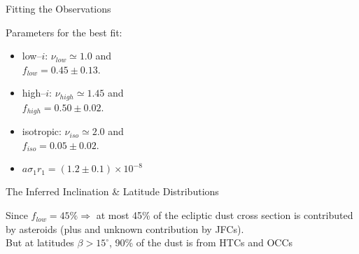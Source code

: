 \documentclass[20pt,35mmSlide,landscape]{foils}
\begin{document}
\vspace*{-2in}\parbox{10in}{
\parbox[c]{3.5in}{
\begin{center}
{\large
\vspace*{3ex}Fitting the Observations\vspace*{2ex}}
\end{center}
Parameters for the best fit:
\begin{itemize}
\item low--$i$: $\nu_{low}\simeq1.0$ and\\
$f_{low}=0.45\pm0.13$.\vspace*{0ex}
\item high--$i$: $\nu_{high}\simeq1.45$ and\\
$f_{high}=0.50\pm0.02$.
\item isotropic: $\nu_{iso}\simeq2.0$ and\\
 $f_{iso}=0.05\pm0.02$.
\item $a\sigma_1r_1=(1.2\pm0.1)\times10^{-8}$
\end{itemize}

}
\hfil\parbox{6.5in}{
\begin{figure}[t]
\vspace*{-0.25in}
\end{figure}
}
}

\newpage
\pagecolor{light-yellow}
\normalsize


\vspace*{-1.6in}\begin{center}
The Inferred Inclination \& Latitude Distributions
\end{center}
\vspace*{-0.6in}\parbox{10in}{
\parbox{5in}{
\begin{figure}[t]
\end{figure}
}
\hfil\parbox{5in}{
\begin{figure}[t]
\end{figure}
}

}
\vspace*{-1.3ex}\parbox{10in}{\small
Since $f_{low}=45\%\Rightarrow$ at most 45\%
of the ecliptic dust cross section is contributed by asteroids
(plus and unknown contribution by JFCs).\vspace*{0.75ex}\\
But at latitudes $\beta>15^\circ$, 90\% of the dust
is from HTCs and OCCs
}
\end{document}

